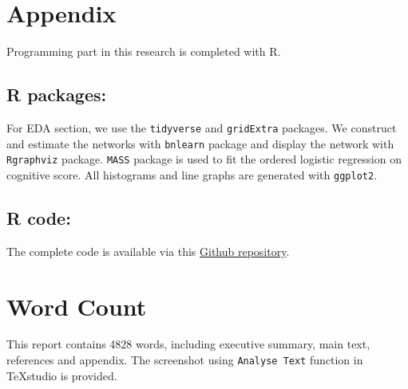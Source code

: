 \documentclass[11pt,twoside]{article}
\numberwithin{Theorem}{section}
\numberwithin{Definition}{section}
\numberwithin{Lemma}{section}
\numberwithin{Algorithm}{section}
\numberwithin{equation}{section}
\begin{document}
\clearpage



\clearpage

\appendix
\section*{Appendix}

Programming part in this research is completed with R. 

\subsection*{R packages:}

For EDA section, we use the \texttt{tidyverse} and \texttt{gridExtra} packages. We construct and estimate the networks with \texttt{bnlearn} package and display the network with \texttt{Rgraphviz} package. \texttt{MASS} package is used to fit the ordered logistic regression on cognitive score. All histograms and line graphs are generated with \texttt{ggplot2}.

\subsection*{R code: }
The complete code is available via this \href{https://github.com/Shi-Yile/Project-1-Dementia-Risk-Factors.git}{Github repository}.

\clearpage

\section*{Word Count}

This report contains 4828 words, including executive summary, main text, references and appendix. The screenshot using  \texttt{Analyse Text} function in TeXstudio is provided.
\end{document}
